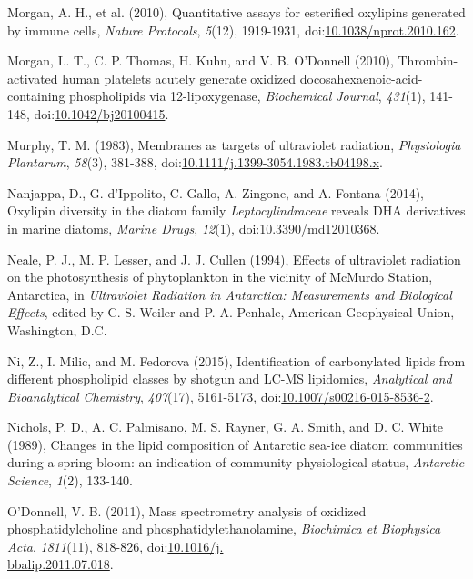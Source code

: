 \begin{singlespace}
{{Morgan, A. H., et al. (2010), Quantitative assays for esterified oxylipins generated by immune cells, \emph{Nature Protocols}, \emph{5}(12), 1919-1931, doi:\href{http://dx.doi.org/10.1038/nprot.2010.162}{10.1038/nprot.2010.162}.

Morgan, L. T., C. P. Thomas, H. Kuhn, and V. B. O'Donnell (2010), Thrombin-activated human platelets acutely generate oxidized docosahexaenoic-acid-containing phospholipids via 12-lipoxygenase, \emph{Biochemical Journal}, \emph{431}(1), 141-148, doi:\href{http://dx.doi.org/10.1042/bj20100415}{10.1042/bj20100415}.

Murphy, T. M. (1983), Membranes as targets of ultraviolet radiation, \emph{Physiologia Plantarum}, \emph{58}(3), 381-388, doi:\href{http://dx.doi.org/10.1111/j.1399-3054.1983.tb04198.x}{10.1111/j.1399-3054.1983.tb04198.x}.

Nanjappa, D., G. d'Ippolito, C. Gallo, A. Zingone, and A. Fontana (2014), Oxylipin diversity in the diatom family \emph{Leptocylindraceae} reveals DHA derivatives in marine diatoms, \emph{Marine Drugs}, \emph{12}(1), doi:\href{http://dx.doi.org/10.3390/md12010368}{10.3390/md12010368}.

Neale, P. J., M. P. Lesser, and J. J. Cullen (1994), Effects of ultraviolet radiation on the photosynthesis of phytoplankton in the vicinity of McMurdo Station, Antarctica, in \emph{Ultraviolet Radiation in Antarctica: Measurements and Biological Effects}, edited by C. S. Weiler and P. A. Penhale, American Geophysical Union, Washington, D.C.

Ni, Z., I. Milic, and M. Fedorova (2015), Identification of carbonylated lipids from different phospholipid classes by shotgun and LC-MS lipidomics, \emph{Analytical and Bioanalytical Chemistry}, \emph{407}(17), 5161-5173, doi:\href{http://dx.doi.org/10.1007/s00216-015-8536-2}{10.1007/s00216-015-8536-2}.

Nichols, P. D., A. C. Palmisano, M. S. Rayner, G. A. Smith, and D. C. White (1989), Changes in the lipid composition of Antarctic sea-ice diatom communities during a spring bloom: an indication of community physiological status, \emph{Antarctic Science}, \emph{1}(2), 133-140.

O'Donnell, V. B. (2011), Mass spectrometry analysis of oxidized phosphatidylcholine and phosphatidylethanolamine, \emph{Biochimica et Biophysica Acta}, \emph{1811}(11), 818-826, doi:\href{http://dx.doi.org/10.1016/j.bbalip.2011.07.018}{10.1016/j.\\bbalip.2011.07.018}.

}}
\end{singlespace}

